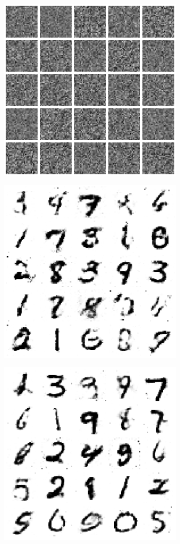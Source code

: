 \documentclass{article}
\begin{document}
\begin{figure}[t]
\begin{subfigure}{0.32\textwidth}
\centering
\includegraphics[scale=0.27]{img/gan_sample_0}
\end{subfigure}
\begin{subfigure}{0.32\textwidth}
\centering
\includegraphics[scale=0.27]{img/gan_sample_40}
\end{subfigure}
\begin{subfigure}{0.32\textwidth}
\centering
\includegraphics[scale=0.27]{img/gan_sample_200}

\end{subfigure}
\end{figure}
\end{document}

